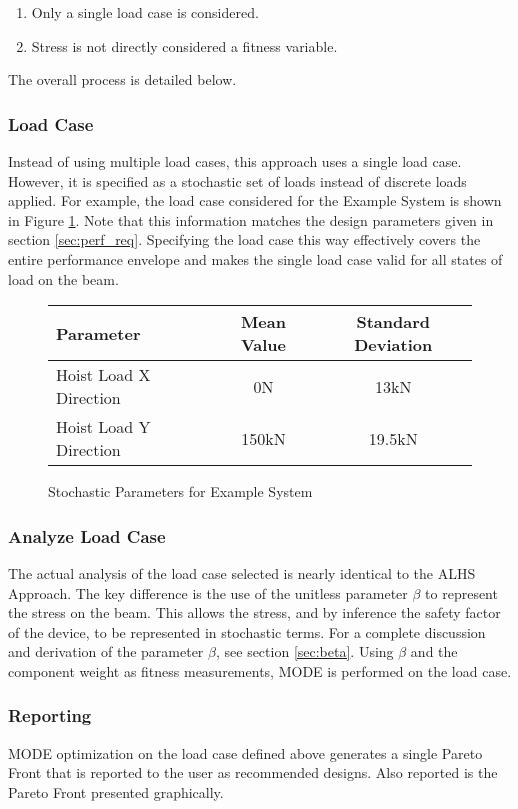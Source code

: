 \begin{enumerate}
\item Only a single load case is considered. 
\item Stress is not directly considered a fitness variable. 
\end{enumerate}
The overall process is detailed below. 

\subsubsection{Load Case}
Instead of using multiple load cases, this approach uses a single load case. However, it is specified as a stochastic set of loads instead of discrete loads applied. For example, the load case considered for the Example System is shown in Figure \ref{fig:stoch_params}. Note that this information matches the design parameters given in section \ref{sec:perf_req}. Specifying the load case this way effectively covers the entire performance envelope and makes the single load case valid for all states of load on the beam. 

\begin{figure}[!h]
    \begin{center}
    \begin{tabular}{|l|cc|}
	    \hline
	    Parameter & Mean Value & Standard Deviation\\
	    \hline
	    Hoist Load X Direction & 0N & 13kN\\
	    Hoist Load Y Direction & 150kN & 19.5kN\\
	    \hline
    \end{tabular}
    \caption{Stochastic Parameters for Example System}
    \label{fig:stoch_params}
    \end{center}
\end{figure}

\subsubsection{Analyze Load Case}
The actual analysis of the load case selected is nearly identical to the ALHS Approach. The key difference is the use of the unitless parameter $\beta$ to represent the stress on the beam. This allows the stress, and by inference the safety factor of the device, to be represented in stochastic terms. For a complete discussion and derivation of the parameter $\beta$, see section \ref{sec:beta}. Using $\beta$ and the component weight as fitness measurements, MODE is performed on the load case.

\subsubsection{Reporting}
MODE optimization on the load case defined above generates a single Pareto Front that is reported to the user as recommended designs. Also reported is the Pareto Front presented graphically. 
